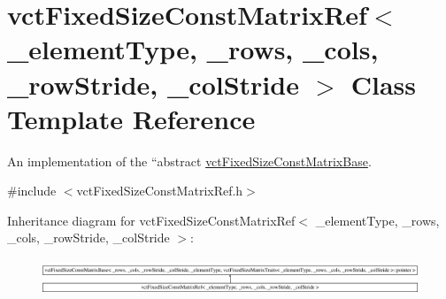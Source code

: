 \hypertarget{classvct_fixed_size_const_matrix_ref}{}\section{vct\+Fixed\+Size\+Const\+Matrix\+Ref$<$ \+\_\+element\+Type, \+\_\+rows, \+\_\+cols, \+\_\+row\+Stride, \+\_\+col\+Stride $>$ Class Template Reference}
\label{classvct_fixed_size_const_matrix_ref}


An implementation of the ``abstract\textquotesingle{}\textquotesingle{} \hyperlink{classvct_fixed_size_const_matrix_base}{vct\+Fixed\+Size\+Const\+Matrix\+Base}.  




{\ttfamily \#include $<$vct\+Fixed\+Size\+Const\+Matrix\+Ref.\+h$>$}

Inheritance diagram for vct\+Fixed\+Size\+Const\+Matrix\+Ref$<$ \+\_\+element\+Type, \+\_\+rows, \+\_\+cols, \+\_\+row\+Stride, \+\_\+col\+Stride $>$\+:\begin{figure}[H]
\begin{center}
\leavevmode
\includegraphics[height=1.099117cm]{d5/d4c/classvct_fixed_size_const_matrix_ref}
\end{center}
\end{figure}
